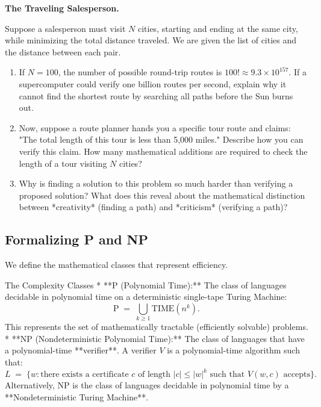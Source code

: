 \documentclass[12pt, a4paper]{book}
\begin{document}
\begin{puzzlebox}
\textbf{The Traveling Salesperson.}

Suppose a salesperson must visit $N$ cities, starting and ending at the same city, while minimizing the total distance traveled.
We are given the list of cities and the distance between each pair.
\begin{enumerate}[label=(\alph*), leftmargin=*]
  \item If $N=100$, the number of possible round-trip routes is $100! \approx 9.3 \times 10^{157}$.
        If a supercomputer could verify one billion routes per second, explain why it cannot find the shortest route by searching all paths before the Sun burns out.
  \item Now, suppose a route planner hands you a specific tour route and claims: "The total length of this tour is less than 5,000 miles."
        Describe how you can verify this claim.
        How many mathematical additions are required to check the length of a tour visiting $N$ cities?
  \item Why is finding a solution to this problem so much harder than verifying a proposed solution?
        What does this reveal about the mathematical distinction between *creativity* (finding a path) and *criticism* (verifying a path)?
\end{enumerate}
\end{puzzlebox}

\subsection{Formalizing P and NP}

We define the mathematical classes that represent efficiency.

\begin{namedconcept}{The Complexity Classes}
* **$\text{P}$ (Polynomial Time):** The class of languages decidable in polynomial time on a deterministic single-tape Turing Machine:
  \[
    \text{P} \;=\; \bigcup_{k \ge 1} \text{TIME}(n^k).
  \]
  This represents the set of mathematically tractable (efficiently solvable) problems.
* **$\text{NP}$ (Nondeterministic Polynomial Time):** The class of languages that have a polynomial-time **verifier**. A verifier $V$ is a polynomial-time algorithm such that:
  \[
    L \;=\; \{w : \text{there exists a certificate } c \text{ of length } |c| \le |w|^k \text{ such that } V(w, c) \text{ accepts}\}.
  \]
  Alternatively, $\text{NP}$ is the class of languages decidable in polynomial time by a **Nondeterministic Turing Machine**.
\end{namedconcept}
\end{document}
